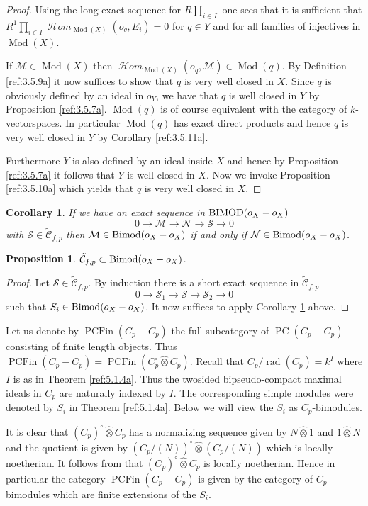 \documentclass{amsproc}
\def\Cscr{{\mathcal C}}
\def\Hscr{{\mathcal H}}
\def\Mscr{{\mathcal M}}
\def\Nscr{{\mathcal N}}
\def\Sscr{{\mathcal S}}
\def\HHom{\operatorname {\Hscr \mathit{om}}}
\def\ctimes{\mathbin{\hat{\otimes}}}
\def\Bimod{\mathop{\text{Bimod}}}
\def\BIMOD{\mathop{\text{BIMOD}}}
\def\rad{\operatorname {rad}}
\def\HHom{\operatorname {\Hscr \mathit{om}}}
\def\Qch{\operatorname {Mod}}
\def\r{\rightarrow}
\let\oldtext\text
\def\text#1{\oldtext{\upshape #1}}
\DeclareMathOperator{\PC}{PC}
\DeclareMathOperator{\PCFin}{PCFin}
\newtheorem{propositions}[lemmas]{Proposition}
\newtheorem{corollarys}[lemmas]{Corollary}
\theoremstyle{definition}
\theoremstyle{remark}
\numberwithin{equation}{section}
\numberwithin{table}{section}
\numberwithin{figure}{section}
\begin{document}
\begin{proof}
 Using the long exact sequence for
$R\prod_{i\in I}$ one sees that it is sufficient that  $R^1\prod_{i\in I}
\HHom_{\Qch(X)}(o_q,E_i) =0$ for $q\in Y$ and for all
families of injectives in $\Qch(X)$.

If $\Mscr\in\Qch(X)$ then $\HHom_{\Qch(X)}(o_q,\Mscr)\in \Qch(q)$.
By Definition \ref{ref:3.5.9a} it now suffices to show that $q$ is
very well closed in $X$. Since $q$ is obviously defined by an ideal in
$o_Y$, we have that $q$ is well closed in $Y$ by Proposition
\ref{ref:3.5.7a}.  $\Qch(q)$ is of course equivalent with the category
of $k$-vectorspaces.  In particular $\Qch(q)$ has exact direct
products and hence $q$ is very well closed in $Y$ by Corollary
\ref{ref:3.5.11a}.



 Furthermore $Y$ is also defined by an ideal inside $X$ and hence  by
 Proposition \ref{ref:3.5.7a} it follows that $Y$
is well closed in $X$. Now we invoke Proposition \ref{ref:3.5.10a} which
yields that $q$ is very well closed in $X$.
\end{proof}
\begin{corollarys}
\label{ref:5.5.6a}
If we have an exact sequence in $\BIMOD(o_X-o_X)$
\[
0\r \Mscr\r \Nscr\r \Sscr\r 0
\]
with $\Sscr\in\tilde{\Cscr}_{f,p}$ then $\Mscr\in \Bimod(o_X-o_X)$ if and
only if $\Nscr \in \Bimod(o_X-o_X)$.
\end{corollarys}
\begin{propositions}
$\tilde{\Cscr}_{f,p}\subset \Bimod(o_X-o_X)$.
\end{propositions}
\begin{proof}
 Let 
$\Sscr\in \tilde{\Cscr}_{f,p}
$. 
By induction there is a
short exact sequence in $\tilde{\Cscr}_{f,p}$ 
\[
0\r \Sscr_1\r \Sscr\r \Sscr_2\r 0
\]
such that $S_i\in \Bimod(o_X-o_X)$. It now suffices to apply Corollary
\ref{ref:5.5.6a} above.
\end{proof}
Let us denote by $\PCFin(C_p-C_p)$ the full subcategory of
$\PC(C_p-C_p)$ consisting of finite length objects. Thus
$\PCFin(C_p-C_p)=\PCFin(C_p^\circ\ctimes C_p)$. Recall that
$C_p/\rad(C_p)=k^I$ where $I$ is as in Theorem \ref{ref:5.1.4a}. Thus
the twosided bipseudo-compact maximal ideals in $C_p$ are naturally
indexed by $I$. The corresponding simple modules were denoted by $S_i$
in Theorem \ref{ref:5.1.4a}. Below we will view the $S_i$ as
$C_p$-bimodules.



It is clear that $(C_p)^\circ \ctimes C_p$ has a normalizing sequence
given by $N\ctimes 1$ and $1\ctimes N$ and the quotient is given by
$(C_p/(N))^\circ\ctimes (C_p/(N))$ which is locally noetherian. It
follows from \cite[Prop. 3.23]{VdBVG} that $(C_p)^\circ\ctimes C_p$ is
locally noetherian. Hence in particular the category $\PCFin(C_p-C_p)$ is
given by the category of $C_p$-bimodules which are finite extensions of
the $S_i$.
\end{document}
